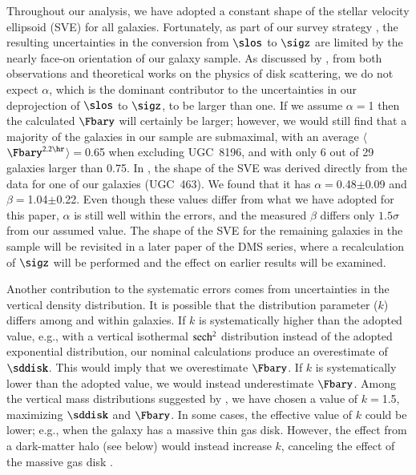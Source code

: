 \documentclass[traditabstract]{aa} %
\begin{document}
Throughout our analysis, we have adopted a constant shape of the stellar velocity 
ellipsoid (SVE) for all galaxies. Fortunately, as part of our survey strategy 
, the resulting uncertainties in the conversion from $\slos$ to 
$\sigz$ are limited by the nearly face-on orientation of our galaxy sample. As discussed 
by \cite{herrmann2009}, from both observations
and theoretical works on the physics of disk scattering,
we do not expect $\alpha$, which is the dominant contributor to the uncertainties in our 
deprojection of $\slos$ to $\sigz$, to be larger than one. If we assume $\alpha$$=$1 then 
the calculated $\Fbary$ will certainly be larger; however, we would still find that a 
majority of the galaxies in our sample are submaximal, with an average 
$\langle$$\Fbary^{2.2\hr}$$\rangle$$=$0.65 when excluding UGC~8196, and with only 6 out
of 29 galaxies larger than 0.75.
In , the shape of the SVE was derived directly from the data
for one of our galaxies (UGC~463). We found that it has $\alpha$$=$0.48$\pm$0.09 and
$\beta$$=$1.04$\pm$0.22. Even though these values differ from what we have adopted for
this paper, $\alpha$ is still well within the errors, and the measured $\beta$ differs
only $1.5\sigma$ from our assumed value. The shape of the SVE for the remaining galaxies
in the sample will be revisited in a later paper of the DMS series,
where a recalculation of $\sigz$ will be performed and the effect on earlier results will
be examined.

Another contribution to the systematic errors comes from uncertainties in the vertical
density distribution. It is possible that the distribution parameter ($k$) differs among
and within galaxies. If $k$ is systematically higher than the adopted value, e.g., with a
vertical isothermal $\rm sech^2$ distribution instead of the adopted exponential
distribution, our nominal calculations produce an overestimate of $\sddisk$. This would
imply that we overestimate $\Fbary$. If $k$ is systematically lower than the adopted
value, we would instead underestimate $\Fbary$.
Among the vertical mass distributions suggested by \cite{kruit1988}, we have chosen a 
value of $k$$=$1.5, maximizing $\sddisk$ and $\Fbary$. In some cases, the effective value
of $k$ could be lower; e.g., when the galaxy has a massive thin gas disk. However, the
effect from a dark-matter halo (see below) would instead increase $k$, canceling the 
effect of the massive gas disk .
\end{document}
